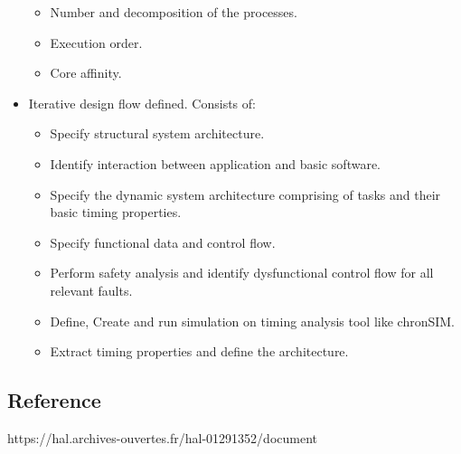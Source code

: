\begin{itemize}
\begin{itemize}
		\item Number and decomposition of the processes.
		\item Execution order.
		\item Core affinity.
	\end{itemize}
	\item Iterative design flow defined. Consists of:
	\begin{itemize}
		\item Specify structural system architecture.
		\item Identify interaction between application and basic software.
		\item Specify the dynamic system architecture comprising of tasks and their basic timing properties.
		\item Specify functional data and control flow.
		\item Perform safety analysis and identify dysfunctional control flow for all relevant faults.
		\item Define, Create and run simulation on timing analysis tool like chronSIM.
		\item Extract timing properties and define the architecture. 
	\end{itemize}
\end{itemize}
\subsection*{Reference}
https://hal.archives-ouvertes.fr/hal-01291352/document